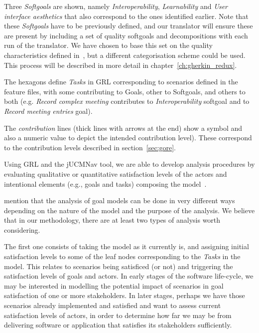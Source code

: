 \documentclass[dissertation,final]{softeng}
\begin{document}
Three \emph{Softgoals} are shown, namely \emph{Interoperability}, \emph{Learnability} and \emph{User interface aesthetics} that also correspond to the ones identified earlier. Note that these \emph{Softgoals} have to be previously defined, and our translator will ensure these are present by including a set of quality softgoals and decompositions with each run of the translator. We have chosen to base this set on the quality characteristics defined in~\citet{ieee_std_25010}, but a different categorisation scheme could be used. This process will be described in more detail in chapter~\ref{ch:gherkin_redux}.

The hexagons define \emph{Tasks} in GRL corresponding to scenarios defined in the feature files, with some contributing to Goals,  other to Softgoals, and others to both (e.g. \emph{Record complex meeting} contributes to \emph{Interoperability} softgoal and to \emph{Record meeting entries} goal).

The \emph{contribution} lines (thick lines with arrows at the end) show a symbol and also a numeric value to depict the intended contribution level). These correspond to the contribution levels described in section~\ref{sec:gore}.

Using GRL and the jUCMNav tool, we are able to develop analysis procedures by evaluating qualitative or quantitative satisfaction levels of the actors and intentional elements (e.g., goals and tasks) composing the model~\citep{Amyot2010}.

\citet{Amyot2010} mention that the analysis of goal models can be done in very different ways depending on the nature of the model and the purpose of the analysis. We believe that in our methodology, there are at least two types of analysis worth considering. 

The first one consists of taking the model as it currently is, and assigning initial satisfaction levels to some of the leaf nodes corresponding to the \emph{Tasks} in the model. This relates to scenarios being satisficed (or not) and triggering the satisfaction levels of goals and actors. In early stages of the software life-cycle, we may be interested in modelling the potential impact of scenarios in goal satisfaction of one or more stakeholders. In later stages, perhaps we have those scenarios already implemented and satisfied and want to assess current satisfaction levels of actors, in order to determine how far we may be from delivering software or application that satisfies its stakeholders sufficiently.
\end{document}
